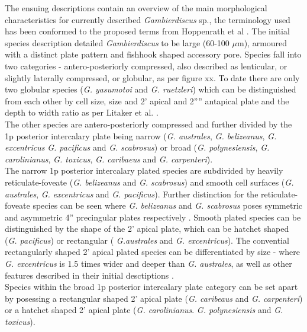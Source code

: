 \documentclass[12pt]{article}
\begin{document}
The ensuing descriptions contain an overview of the main morphological characteristics for currently described \emph{Gambierdiscus} sp., the terminology used has been conformed to the proposed terms from Hoppenrath et al \cite{hoppenrath2013taxonomy}. The initial species description detailed \emph{Gambierdiscus} to be large (60-100 $\mu$m), armoured with a distinct plate pattern and fishhook shaped accessory pore. Species fall into two categories - antero-posteriorly compressed, also described as lenticular, or slightly laterally compressed, or globular, as per figure xx. %
 To date there are only two globular species (\emph{G. yasumotoi} and \emph{G. ruetzleri}) which can be distinguished from each other by cell size, size and 2' apical and 2'''' antapical plate and the depth to width ratio as per Litaker et al. \cite{litaker2009taxonomy}. \\
The other species are antero-posteriorly compressed and further divided by the 1p posterior intercalary plate being narrow (\emph{G. australes}, \emph{G. belizeanus}, \emph{G. excentricus} \emph{G. pacificus} and \emph{G. scabrosus}) or broad (\emph{G. polynesiensis}, \emph{G. carolinianus}, \emph{G. toxicus}, \emph{G. caribaeus} and \emph{G. carpenteri}). \\
The narrow 1p posterior intercalary plated species are subdivided by heavily reticulate-foveate (\emph{G. belizeanus} and \emph{G. scabrosus}) and smooth cell surfaces (\emph{G. australes}, \emph{G. excentricus} and \emph{G. pacificus}). Further distinction for the reticulate-foveate species can be seen where \emph{G. belizeanus} and \emph{G. scabrosus} poses symmetric and asymmetric 4'' precingular plates respectively \cite{nishimura2014morphology}. %
Smooth plated species can be distinguished by the shape of the 2' apical plate, which can be hatchet shaped (\emph{G. pacificus}) or rectangular ( \emph{G.australes} and \emph{G. excentricus}). The convential rectangularly shaped 2' apical plated species can be differentiated by size - where \emph{G. excentricus} is 1.5 times wider and deeper than \emph{G. australes}, as well as other features described in their initial desctiptions \cite{chinain1999morphology,fraga2011gambierdiscus}. \\
Species within the broad 1p posterior intercalary plate category can be set apart by posessing a rectangular shaped 2' apical plate (\emph{G. caribeaus} and \emph{G. carpenteri}) or a hatchet shaped 2' apical plate (\emph{G. carolinianus}. \emph{G. polynesiensis} and \emph{G. toxicus}).
\end{document}
